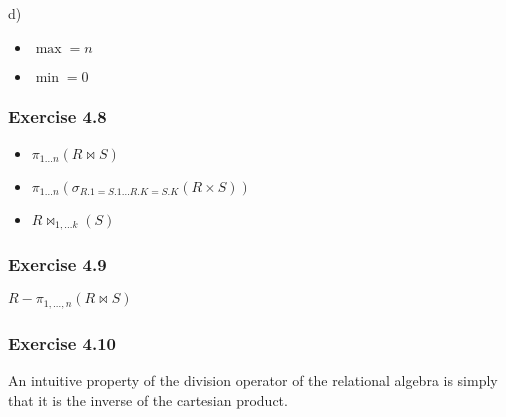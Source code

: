 d)

\begin{itemize}
  \item $\max = n$
  \item $\min = 0$
\end{itemize}

\subsubsection*{Exercise 4.8}

\begin{itemize}
  \item $\pi_{1\dots n}(R \bowtie S)$
  \item $\pi_{1\dots n}(\sigma_{R.1=S.1 
        \dots R.K=S.K}(R \times S))$
  \item $R \bowtie_{1, \dots k}(S)$
\end{itemize}

\subsubsection*{Exercise 4.9}

$R - \pi_{1,\dots,n}(R \bowtie S)$

\subsubsection*{Exercise 4.10}

An intuitive property of the division operator of
the relational algebra is simply that it is the inverse
of the cartesian product.
